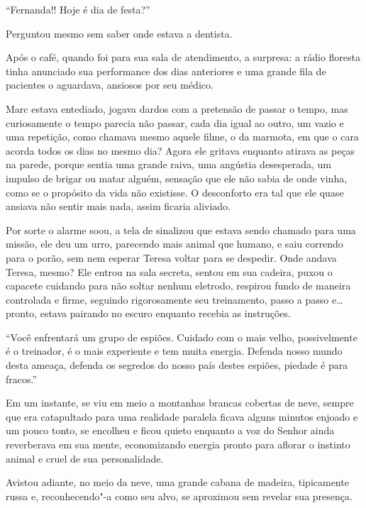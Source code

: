 ``Fernanda!! Hoje é dia de festa?''

Perguntou mesmo sem saber onde estava a dentista.

Após o café, quando foi para sua sala de atendimento, a surpresa: a
rádio floresta tinha anunciado sua performance dos dias anteriores e uma
grande fila de pacientes o aguardava, ansiosos por seu médico.

\asterisc


Marc estava entediado, jogava dardos com a pretensão de passar o tempo,
mas curiosamente o tempo parecia não passar, cada dia igual ao outro, um
vazio e uma repetição, como chamava mesmo aquele filme, o da marmota, em
que o cara acorda todos os dias no mesmo dia? Agora ele gritava enquanto
atirava as peças na parede, porque sentia uma grande raiva, uma angústia
desesperada, um impulso de brigar ou matar alguém, sensação que ele não
sabia de onde vinha, como se o propósito da vida não existisse. O
desconforto era tal que ele quase ansiava não sentir mais nada, assim
ficaria aliviado.

Por sorte o alarme soou, a tela de  sinalizou que estava sendo
chamado para uma missão, ele deu um urro, parecendo mais animal que
humano, e saiu correndo para o porão, sem nem esperar Teresa voltar para
se despedir. Onde andava Teresa, mesmo? Ele entrou na sala secreta,
sentou em sua cadeira, puxou o capacete cuidando para não soltar nenhum
eletrodo, respirou fundo de maneira controlada e firme, seguindo
rigorosamente seu treinamento, passo a passo e\ldots{} pronto, estava
pairando no escuro enquanto recebia as instruções.

``Você enfrentará um grupo de espiões. Cuidado com o mais velho,
possivelmente é o treinador, é o mais experiente e tem muita energia.
Defenda nosso mundo desta ameaça, defenda os segredos do nosso país
destes espiões, piedade é para fracos.''

Em um instante, se viu em meio a montanhas brancas cobertas de neve,
sempre que era catapultado para uma realidade paralela ficava alguns
minutos enjoado e um pouco tonto, se encolheu e ficou quieto enquanto a
voz do Senhor  ainda reverberava em sua mente, economizando energia
pronto para aflorar o instinto animal e cruel de sua personalidade.

Avistou adiante, no meio da neve, uma grande cabana de madeira,
tipicamente russa e, reconhecendo"-a como seu alvo, se aproximou sem
revelar sua presença.

